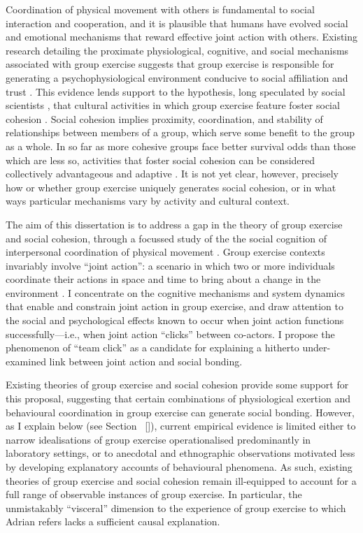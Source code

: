 \begin{CJK}{UTF8}{gbsn}
Coordination of physical movement with others is fundamental to social interaction and cooperation, and it is plausible that humans have evolved social and emotional mechanisms that reward effective joint action with others.  Existing research detailing the proximate physiological, cognitive, and social mechanisms associated with group exercise suggests that group exercise is responsible for generating a psychophysiological environment conducive to social affiliation and trust \citep{Davis2015}.  This evidence lends support to the hypothesis, long speculated by social scientists \citep[see, for example][]{Durkheim1965}, that cultural activities in which group exercise feature foster social cohesion \citep{Dunbar2010,Whitehouse2004}.  Social cohesion implies proximity, coordination, and stability of relationships between members of a group, which serve some benefit to the group as a whole.  In so far as more cohesive groups face better survival odds than those which are less so, activities that foster social cohesion can be considered collectively advantageous and adaptive \citep{Dunbar2010}.  It is not yet clear, however, precisely how or whether group exercise uniquely generates social cohesion, or in what ways particular mechanisms vary by activity and cultural context.

The aim of this dissertation is to address a gap in the theory of group exercise and social cohesion, through a focussed study of the the social cognition of interpersonal coordination of physical movement \citep{Marsh2009}.  Group exercise contexts invariably involve ``joint action'': a scenario in which two or more individuals coordinate their actions in space and time to bring about a change in the environment \citep{Sebanz2006}.  I concentrate on the cognitive mechanisms and system dynamics that enable and constrain joint action in group exercise, and draw attention to the social and psychological effects known to occur when joint action functions successfully---i.e., when joint action ``clicks'' between co-actors.  I propose the phenomenon of ``team click'' as a candidate for explaining a hitherto under-examined link between joint action and social bonding.

Existing theories of group exercise and social cohesion provide some support for this proposal, suggesting that certain combinations of physiological exertion and behavioural coordination in group exercise can generate social bonding.  However, as I explain below (see Section ~\ref{}), current empirical evidence is limited either to narrow idealisations of group exercise operationalised predominantly in laboratory settings, or to anecdotal and ethnographic observations motivated less by developing explanatory accounts of behavioural phenomena.  As such, existing theories of group exercise and social cohesion remain ill-equipped to account for a full range of observable instances of group exercise.   In particular, the unmistakably ``visceral'' dimension to the experience of group exercise to which Adrian refers lacks a sufficient causal explanation.


\end{CJK}
